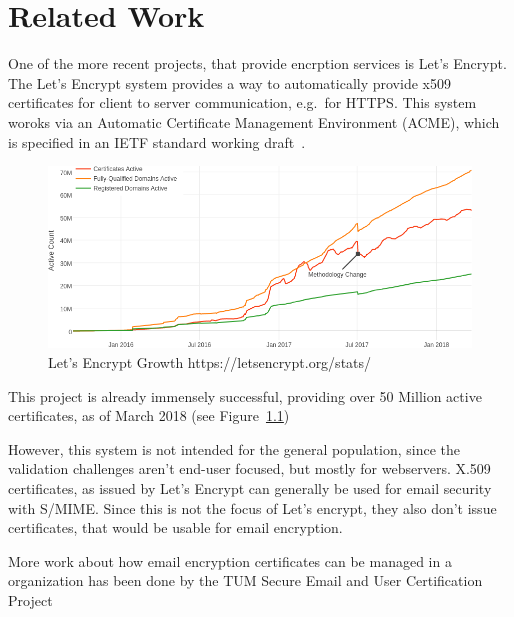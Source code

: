 \chapter{Related Work}\label{ch:relatedWork}
One of the more recent projects, that provide encrption services is Let's Encrypt.
The Let's Encrypt system provides a way to automatically provide x509 certificates for client to server communication,
e.g.\ for HTTPS\@.
This system woroks via an Automatic Certificate Management Environment (ACME), which is specified in an IETF standard
working draft~\cite{letsencrypteacme}.

\begin{figure}
    \centering
    \includegraphics[width=\textwidth]{figures/letsencryptusers.png}
    \caption{Let's Encrypt Growth https://letsencrypt.org/stats/}
    \label{fig:letsencrypt}
\end{figure}

This project is already immensely successful, providing over 50 Million active certificates, as of March 2018 (see
Figure~\ref{fig:letsencrypt})

However, this system is not intended for the general population, since the validation challenges aren't end-user
focused, but mostly for webservers.
X.509 certificates, as issued by Let's Encrypt can generally be used for email security with S/MIME.
Since this is not the focus of Let's encrypt, they also don't issue certificates, that would be usable for email
encryption.

More work about how email encryption certificates can be managed in a organization has been done by the TUM Secure
Email and User Certification Project~\cite{haunerIdp, jagdish2016certservice, straub2016directoryservice, maier2015multidevice}
